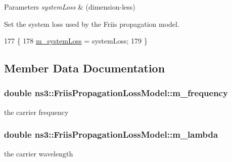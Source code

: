 \begin{DoxyParams}{Parameters}
{\em system\+Loss} & (dimension-\/less)\\
\hline
\end{DoxyParams}
Set the system loss used by the Friis propagation model. 
\begin{DoxyCode}
177 \{
178   \hyperlink{classns3_1_1FriisPropagationLossModel_ad547e83f7bdb1f4ba7205909886f16f3}{m\_systemLoss} = systemLoss;
179 \}
\end{DoxyCode}


\subsection{Member Data Documentation}
\subsubsection[{\texorpdfstring{m\+\_\+frequency}{m_frequency}}]{\setlength{\rightskip}{0pt plus 5cm}double ns3\+::\+Friis\+Propagation\+Loss\+Model\+::m\+\_\+frequency\hspace{0.3cm}{\ttfamily [private]}}\hypertarget{classns3_1_1FriisPropagationLossModel_a4bb14f42a54c502525911272b19dd35f}{}\label{classns3_1_1FriisPropagationLossModel_a4bb14f42a54c502525911272b19dd35f}


the carrier frequency 

\subsubsection[{\texorpdfstring{m\+\_\+lambda}{m_lambda}}]{\setlength{\rightskip}{0pt plus 5cm}double ns3\+::\+Friis\+Propagation\+Loss\+Model\+::m\+\_\+lambda\hspace{0.3cm}{\ttfamily [private]}}\hypertarget{classns3_1_1FriisPropagationLossModel_a28e4560ba2a05fa63bd2bcc341a7967b}{}\label{classns3_1_1FriisPropagationLossModel_a28e4560ba2a05fa63bd2bcc341a7967b}


the carrier wavelength 

